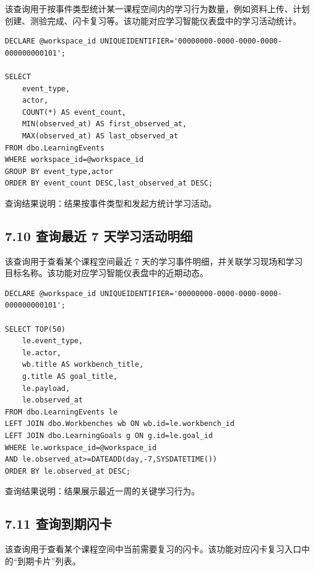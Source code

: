\documentclass[10pt,a4paper,fontset=none]{ctexart}
\begin{document}
该查询用于按事件类型统计某一课程空间内的学习行为数量，例如资料上传、计划创建、测验完成、闪卡复习等。该功能对应学习智能仪表盘中的学习活动统计。\par

\begin{Verbatim}[fontsize=\scriptsize,frame=single]
DECLARE @workspace_id UNIQUEIDENTIFIER='00000000-0000-0000-0000-000000000101';

SELECT
    event_type,
    actor,
    COUNT(*) AS event_count,
    MIN(observed_at) AS first_observed_at,
    MAX(observed_at) AS last_observed_at
FROM dbo.LearningEvents
WHERE workspace_id=@workspace_id
GROUP BY event_type,actor
ORDER BY event_count DESC,last_observed_at DESC;
\end{Verbatim}

查询结果说明：结果按事件类型和发起方统计学习活动。\par

\subsection*{7.10 查询最近 7 天学习活动明细}

该查询用于查看某个课程空间最近 7 天的学习事件明细，并关联学习现场和学习目标名称。该功能对应学习智能仪表盘中的近期动态。\par

\begin{Verbatim}[fontsize=\scriptsize,frame=single]
DECLARE @workspace_id UNIQUEIDENTIFIER='00000000-0000-0000-0000-000000000101';

SELECT TOP(50)
    le.event_type,
    le.actor,
    wb.title AS workbench_title,
    g.title AS goal_title,
    le.payload,
    le.observed_at
FROM dbo.LearningEvents le
LEFT JOIN dbo.Workbenches wb ON wb.id=le.workbench_id
LEFT JOIN dbo.LearningGoals g ON g.id=le.goal_id
WHERE le.workspace_id=@workspace_id
AND le.observed_at>=DATEADD(day,-7,SYSDATETIME())
ORDER BY le.observed_at DESC;
\end{Verbatim}

查询结果说明：结果展示最近一周的关键学习行为。\par

\subsection*{7.11 查询到期闪卡}

该查询用于查看某个课程空间中当前需要复习的闪卡。该功能对应闪卡复习入口中的“到期卡片”列表。\par
\end{document}
